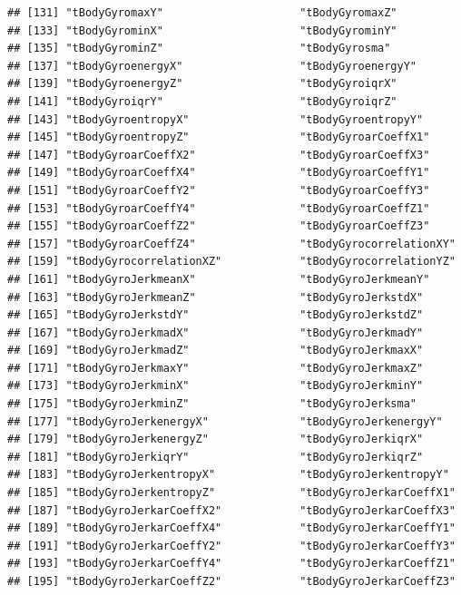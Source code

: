 \documentclass[
]{article}
\begin{document}
\begin{verbatim}
## [131] "tBodyGyromaxY"                     "tBodyGyromaxZ"                    
## [133] "tBodyGyrominX"                     "tBodyGyrominY"                    
## [135] "tBodyGyrominZ"                     "tBodyGyrosma"                     
## [137] "tBodyGyroenergyX"                  "tBodyGyroenergyY"                 
## [139] "tBodyGyroenergyZ"                  "tBodyGyroiqrX"                    
## [141] "tBodyGyroiqrY"                     "tBodyGyroiqrZ"                    
## [143] "tBodyGyroentropyX"                 "tBodyGyroentropyY"                
## [145] "tBodyGyroentropyZ"                 "tBodyGyroarCoeffX1"               
## [147] "tBodyGyroarCoeffX2"                "tBodyGyroarCoeffX3"               
## [149] "tBodyGyroarCoeffX4"                "tBodyGyroarCoeffY1"               
## [151] "tBodyGyroarCoeffY2"                "tBodyGyroarCoeffY3"               
## [153] "tBodyGyroarCoeffY4"                "tBodyGyroarCoeffZ1"               
## [155] "tBodyGyroarCoeffZ2"                "tBodyGyroarCoeffZ3"               
## [157] "tBodyGyroarCoeffZ4"                "tBodyGyrocorrelationXY"           
## [159] "tBodyGyrocorrelationXZ"            "tBodyGyrocorrelationYZ"           
## [161] "tBodyGyroJerkmeanX"                "tBodyGyroJerkmeanY"               
## [163] "tBodyGyroJerkmeanZ"                "tBodyGyroJerkstdX"                
## [165] "tBodyGyroJerkstdY"                 "tBodyGyroJerkstdZ"                
## [167] "tBodyGyroJerkmadX"                 "tBodyGyroJerkmadY"                
## [169] "tBodyGyroJerkmadZ"                 "tBodyGyroJerkmaxX"                
## [171] "tBodyGyroJerkmaxY"                 "tBodyGyroJerkmaxZ"                
## [173] "tBodyGyroJerkminX"                 "tBodyGyroJerkminY"                
## [175] "tBodyGyroJerkminZ"                 "tBodyGyroJerksma"                 
## [177] "tBodyGyroJerkenergyX"              "tBodyGyroJerkenergyY"             
## [179] "tBodyGyroJerkenergyZ"              "tBodyGyroJerkiqrX"                
## [181] "tBodyGyroJerkiqrY"                 "tBodyGyroJerkiqrZ"                
## [183] "tBodyGyroJerkentropyX"             "tBodyGyroJerkentropyY"            
## [185] "tBodyGyroJerkentropyZ"             "tBodyGyroJerkarCoeffX1"           
## [187] "tBodyGyroJerkarCoeffX2"            "tBodyGyroJerkarCoeffX3"           
## [189] "tBodyGyroJerkarCoeffX4"            "tBodyGyroJerkarCoeffY1"           
## [191] "tBodyGyroJerkarCoeffY2"            "tBodyGyroJerkarCoeffY3"           
## [193] "tBodyGyroJerkarCoeffY4"            "tBodyGyroJerkarCoeffZ1"           
## [195] "tBodyGyroJerkarCoeffZ2"            "tBodyGyroJerkarCoeffZ3"           

\end{verbatim}
\end{document}
